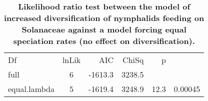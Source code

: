 \documentclass[10pt]{article}
\begin{document}
\begin{table}[!h]
    \caption{\bf{Likelihood ratio test between the model of increased
diversification of nymphalids feeding on Solanaceae against a model
forcing equal speciation rates (no effect on diversification).}}
\begin{tabular}{lcrrlr}
Df           & lnLik & AIC     & ChiSq  & \multicolumn{1}{r}{p} &         \\
full         & 6     & -1613.3 & 3238.5 &                       &         \\
equal.lambda & 5     & -1619.4 & 3248.9 & 12.3                  & 0.00045
\end{tabular}
\end{table}

\pagebreak
{}

\end{document}
